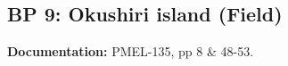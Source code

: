 \newsection

\subsection{BP 9:
 Okushiri island (Field)}

{\bf Documentation:}  PMEL-135, pp 8 \& 48-53.
